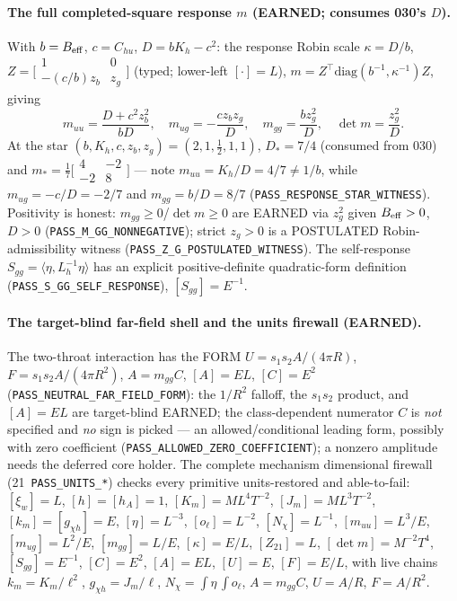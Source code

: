 \paragraph{The full completed-square response \(m\) (EARNED; consumes 030's \(D\)).}
With \(b=B_{\rm eff}\), \(c=C_{hu}\), \(D=bK_h-c^2\): the response Robin scale
\(\kappa=D/b\),
\(Z=\bigl[\begin{smallmatrix}1&0\\-(c/b)z_b&z_g\end{smallmatrix}\bigr]\) (typed;
lower-left \([\cdot]=L\)), \(m=Z^\top\mathrm{diag}(b^{-1},\kappa^{-1})Z\), giving
\[
  m_{uu}=\frac{D+c^2z_b^2}{bD},\quad m_{ug}=-\frac{c z_b z_g}{D},\quad
  m_{gg}=\frac{b z_g^2}{D},\quad \det m=\frac{z_g^2}{D}.
\]
At the star \((b,K_h,c,z_b,z_g)=(2,1,\tfrac12,1,1)\), \(D_*=7/4\) (consumed from
030) and \(m_*=\tfrac17\bigl[\begin{smallmatrix}4&-2\\-2&8\end{smallmatrix}\bigr]\)
--- note \(m_{uu}=K_h/D=4/7\ne1/b\), while \(m_{ug}=-c/D=-2/7\) and
\(m_{gg}=b/D=8/7\) (\texttt{PASS\_RESPONSE\_STAR\_WITNESS}). Positivity is honest:
\(m_{gg}\ge0\)/\(\det m\ge0\) are EARNED via \(z_g^2\) given \(B_{\rm eff}>0\),
\(D>0\) (\texttt{PASS\_M\_GG\_NONNEGATIVE}); strict \(z_g>0\) is a POSTULATED
Robin-admissibility witness (\texttt{PASS\_Z\_G\_POSTULATED\_WITNESS}). The
self-response \(S_{gg}=\langle\eta,L_h^{-1}\eta\rangle\) has an explicit
positive-definite quadratic-form definition (\texttt{PASS\_S\_GG\_SELF\_RESPONSE}),
\([S_{gg}]=E^{-1}\).

\paragraph{The target-blind far-field shell and the units firewall (EARNED).}
The two-throat interaction has the FORM \(U=s_1s_2A/(4\pi R)\),
\(F=s_1s_2A/(4\pi R^2)\), \(A=m_{gg}C\), \([A]=EL\), \([C]=E^2\)
(\texttt{PASS\_NEUTRAL\_FAR\_FIELD\_FORM}): the \(1/R^2\) falloff, the \(s_1s_2\)
product, and \([A]=EL\) are target-blind EARNED; the class-dependent numerator
\(C\) is \emph{not} specified and \emph{no} sign is picked --- an
allowed/conditional leading form, possibly with zero coefficient
(\texttt{PASS\_ALLOWED\_ZERO\_COEFFICIENT}); a nonzero amplitude needs the
deferred core holder. The complete mechanism dimensional firewall
(21~\texttt{PASS\_UNITS\_*}) checks every primitive units-restored and
able-to-fail: \([\xi_w]=L\), \([h]=[h_A]=1\), \([K_m]=ML^4T^{-2}\),
\([J_m]=ML^3T^{-2}\), \([k_m]=[g_{\chi h}]=E\), \([\eta]=L^{-3}\),
\([o_\ell]=L^{-2}\), \([N_\chi]=L^{-1}\), \([m_{uu}]=L^3/E\), \([m_{ug}]=L^2/E\),
\([m_{gg}]=L/E\), \([\kappa]=E/L\), \([Z_{21}]=L\), \([\det m]=M^{-2}T^4\),
\([S_{gg}]=E^{-1}\), \([C]=E^2\), \([A]=EL\), \([U]=E\), \([F]=E/L\), with live
chains \(k_m=K_m/\ell^2\), \(g_{\chi h}=J_m/\ell\),
\(N_\chi=\int\eta\,\int o_\ell\), \(A=m_{gg}C\), \(U=A/R\), \(F=A/R^2\).

